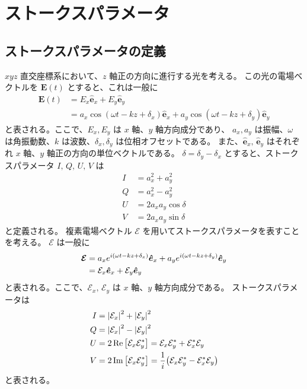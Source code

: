 \documentclass[../../main.tex]{subfiles}
\begin{document}
\chapter{ストークスパラメータ}
\label{chap:stokes}
\section{ストークスパラメータの定義}
\label{sec:stokes}
$xyz$ 直交座標系において、$z$ 軸正の方向に進行する光を考える。
この光の電場ベクトルを $\bm{E}(t)$ とすると、これは一般に
\begin{align}
    \bm{E}(t) &= E_{x} \bm{\hat{e}}_{x} + E_{y} \bm{\hat{e}}_{y} \\
        &= a_{x}\cos(\omega t - kz + \delta_x) \bm{\hat{e}}_{x} + a_{y}\cos(\omega t - kz + \delta_y) \bm{\hat{e}}_{y}
\end{align}
と表される。ここで、$E_{x}, E_{y}$ は $x$ 軸、$y$ 軸方向成分であり、
$a_{x}, a_{y}$ は振幅、$\omega$ は角振動数、$k$ は波数、$\delta_x, \delta_y$ は位相オフセットである。
また、$\bm{\hat{e}}_x,\,\bm{\hat{e}}_y$ はそれぞれ $x$ 軸、$y$ 軸正の方向の単位ベクトルである。
$\delta = \delta_y - \delta_x$ とすると、ストークスパラメータ $I,\,Q,\,U,\,V$ は
\begin{align}
    I &= a_{x}^{2} + a_{y}^{2} \\
    Q &= a_{x}^{2} - a_{y}^{2} \\
    U &= 2a_{x}a_{y}\cos\delta \\
    V &= 2a_{x}a_{y}\sin\delta
\end{align}
と定義される。
複素電場ベクトル $\bm{\mathcal{E}}$ を用いてストークスパラメータを表すことを考える。
$\bm{\mathcal{E}}$ は一般に
\begin{align}
    \bm{\mathcal{E}} &= a_{x}e^{i\qty(\omega t-kz+\delta_x)}\bm{\hat{e}}_{x} + a_{y}e^{i\qty(\omega t-kz+\delta_y)}\bm{\hat{e}}_{y} \\
    &= \mathcal{E}_{x}\bm{\hat{e}}_{x} + \mathcal{E}_{y}\bm{\hat{e}}_{y}
    \label{eq:complex_electric_field}
\end{align}
と表される。ここで、$\mathcal{E}_{x},\,\mathcal{E}_{y}$ は $x$ 軸、$y$ 軸方向成分である。
ストークスパラメータは
\begin{align}
    \label{eq:stokes_I_complex}
    I &= \abs{\mathcal{E}_{x}}^{2} + \abs{\mathcal{E}_{y}}^{2} \\
    \label{eq:stokes_Q_complex}
    Q &= \abs{\mathcal{E}_{x}}^{2} - \abs{\mathcal{E}_{y}}^{2} \\
    \label{eq:stokes_U_complex}
    U &= 2\Re\qty[\mathcal{E}_{x}\mathcal{E}_{y}^{*}] = \mathcal{E}_x\mathcal{E}_{y}^{*}+\mathcal{E}_{x}^{*}\mathcal{E}_{y} \\
    \label{eq:stokes_V_complex}
    V &= 2\Im\qty[\mathcal{E}_{x}\mathcal{E}_{y}^{*}] = \dfrac{1}{i}\qty(\mathcal{E}_x\mathcal{E}_{y}^{*}-\mathcal{E}_{x}^{*}\mathcal{E}_{y})
\end{align}
と表される。
\end{document}

